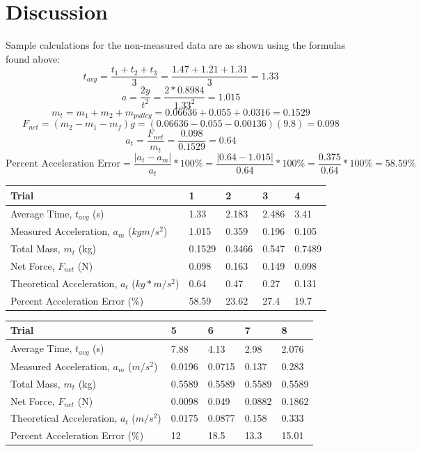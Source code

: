 \documentclass[11pt, titlepage]{article}
\begin{document}
\section*{Discussion}
Sample calculations for the non-measured data are as shown using the formulas found above:
$$t_{avg} = \frac{t_1 + t_2 + t_3}{3} = \frac{1.47 + 1.21 + 1.31}{3} = 1.33$$
$$a = \frac{2y}{t^2} = \frac{2*0.8984}{1.33^2} = 1.015$$
$$m_t = m_1 + m_2 + m_{pulley} = 0.06636 + 0.055 + 0.0316 = 0.1529$$
$$F_{net} = (m_2 - m_1 - m_f)g = (0.06636 - 0.055 - 0.00136)(9.8) = 0.098$$
$$a_t = \frac{F_{net}}{m_t} = \frac{0.098}{0.1529} = 0.64$$
$$\text{Percent Acceleration Error} = \frac{|a_t - a_m|}{a_t}*100\% = \frac{|0.64 - 1.015|}{0.64}*100\% = \frac{0.375}{0.64}*100\% = 58.59\%$$

\begin{center}
\begin{tabular}
{|m{9em}|m{7em}|m{7em}|m{7em}|m{7em}|}
\hline
Trial & 1 & 2 & 3 & 4 \\
\hline
Average Time, $t_{avg}$ (s) & 1.33 & 2.183 & 2.486 & 3.41\\
\hline
Measured Acceleration, $a_m$ ($kgm/s^2$) & 1.015 & 0.359 & 0.196 & 0.105\\
\hline
Total Mass, $m_t$ (kg) & 0.1529 & 0.3466 & 0.547 & 0.7489\\
\hline
Net Force, $F_{net}$ (N) & 0.098 & 0.163 & 0.149 & 0.098\\ 
\hline
Theoretical Acceleration, $a_t$ ($kg*m/s^2$) & 0.64 & 0.47 & 0.27 & 0.131\\
\hline
Percent Acceleration Error (\%) & 58.59 & 23.62 & 27.4 & 19.7\\
\hline
\end{tabular}
\begin{tabular}
{|m{9em}|m{7em}|m{7em}|m{7em}|m{7em}|}
\hline
Trial & 5 & 6 & 7 & 8 \\
\hline
Average Time, $t_{avg}$ (s) & 7.88 & 4.13 & 2.98 & 2.076 \\
\hline
Measured Acceleration, $a_m$ ($m/s^2$) & 0.0196 & 0.0715 & 0.137& 0.283\\
\hline
Total Mass, $m_t$ (kg) & 0.5589 & 0.5589 & 0.5589 & 0.5589\\
\hline
Net Force, $F_{net}$ (N) & 0.0098 & 0.049 & 0.0882 & 0.1862\\ 
\hline
Theoretical Acceleration, $a_t$ ($m/s^2$) & 0.0175 & 0.0877 & 0.158 & 0.333 \\
\hline
Percent Acceleration Error (\%) & 12 & 18.5 & 13.3 & 15.01 \\
\hline
\end{tabular}
\end{center}
\end{document}
